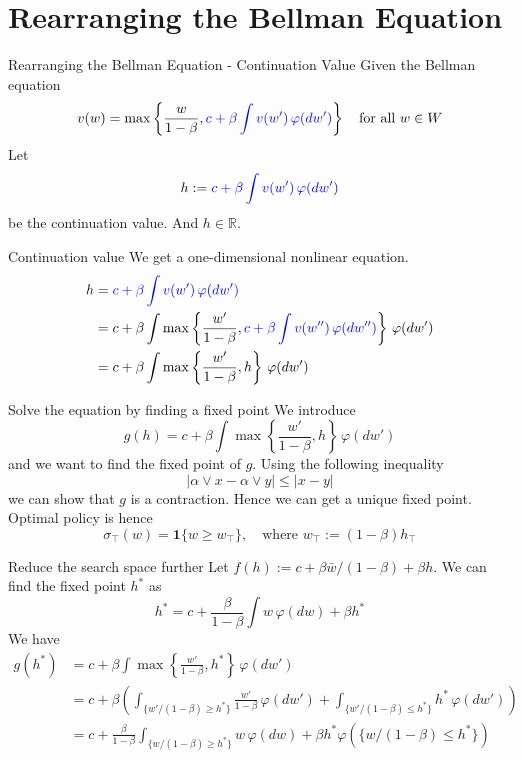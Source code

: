 \section{Rearranging the Bellman Equation}
\begin{frame}{Rearranging the Bellman Equation - Continuation Value}
    Given the Bellman equation
    $$
    v(w)  = \max\left\{\frac{w}{1-\beta}, \textcolor{blue}{c+\beta\int v(w') \,\varphi(dw')}\right\}\quad\text{for all $w\in W$}
    $$
    Let 
    $$
    h:=\textcolor{blue}{c+\beta\int v(w') \,\varphi(dw')}
    $$
    be the continuation value. And $h\in \mathbb{R}$.
\end{frame}

\begin{frame}{Continuation value}
We get a one-dimensional nonlinear equation. 
    \begin{align*}
        h &=\textcolor{blue}{c+\beta\int v(w') \,\varphi(dw')}\\
        &= c + \beta \int \max\left\{\frac{w'}{1-\beta}, \textcolor{blue}{c+\beta\int v(w'') \,\varphi(dw'')}\right\}\, \varphi(dw')\\
        &= c+\beta\int \max\left\{\frac{w'}{1-\beta}, h\right\}\, \varphi(dw')
    \end{align*}
\end{frame}

\begin{frame}{Solve the equation by finding a fixed point}
    We introduce
    $$
    g(h) = c+\beta\int \max\left\{\frac{w'}{1-\beta}, h\right\}\, \varphi(dw')
    $$
    and we want to find the fixed point of $g$. Using the following inequality
    $$
    |\alpha\vee x- \alpha \vee y|\le |x-y|
    $$
    we can show that $g$ is a contraction. Hence we can get a unique fixed point. Optimal policy is hence
    $$
    \sigma_\top (w) = \mathbf{1}\{w\ge w_\top\},\quad \text{where $w_\top:= (1-\beta)h_\top$}
    $$
\end{frame}

\begin{frame}{Reduce the search space further}
    Let $f(h):= c+\beta\bar w/(1-\beta) + \beta h$. We can find the fixed point $h^*$ as
    $$
    h^* = c + \frac{\beta}{1-\beta}\int w\,\varphi(dw) + \beta h^*
    $$
    We have 
    \begin{align*}
        g(h^*) & = c+ \beta \int \max\left\{\frac{w'}{1-\beta}, h^*\right\}\,\varphi(dw')\\
        &= c+ \beta\left(\int_{\{w'/(1-\beta)\ge h^*\}}\frac{w'}{1-\beta}\, \varphi(dw') + \int_{\{w'/(1-\beta)\le h^*\}}h^*\, \varphi(dw')\right)\\
        &= c + \frac{\beta}{1-\beta}\int_{\{w/(1-\beta)\ge h^*\}}w\,\varphi(dw) + \beta h^*\varphi(\{w/(1-\beta)\le h^*\})
    \end{align*}
\end{frame}

